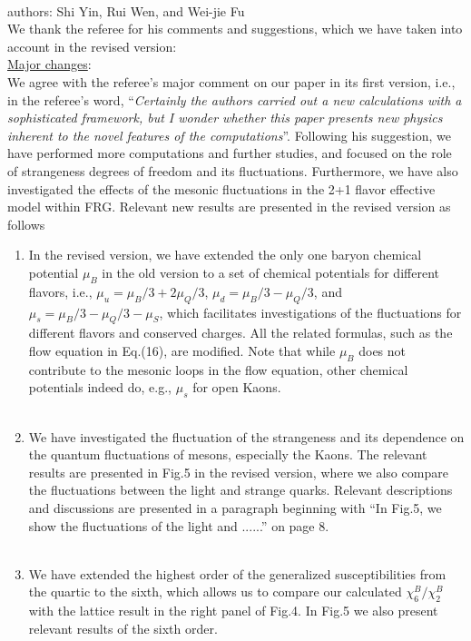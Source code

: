 \documentclass[aps,article,author-year,notitlepage,showpacs]{revtex4-1}
\begin{document}
 

\large

\\

\noindent authors: Shi Yin, Rui Wen, and Wei-jie Fu\\

\noindent We thank the referee for his comments and suggestions, which we have taken into account in the revised version:\\

\noindent \underline{Major changes}:\\

We agree with the referee's major comment on our paper in its first version, i.e., in the referee's word, ``{\it Certainly the authors carried out a new calculations with a sophisticated framework, but I wonder whether this paper presents new physics inherent to the novel features of the computations}''. Following his suggestion, we have performed more computations and further studies, and focused on the role of strangeness degrees of freedom and its fluctuations. Furthermore, we have also investigated the effects of the mesonic fluctuations in the 2+1 flavor effective model within FRG. Relevant new results are presented in the revised version as follows

\begin{enumerate}[1.]

\item In the revised version, we have extended the only one baryon chemical potential $\mu_B$ in the old version to a set of chemical potentials for different flavors, i.e., $\mu_u=\mu_B/3+2\mu_Q/3$, $\mu_d=\mu_B/3-\mu_Q/3$, and $\mu_s=\mu_B/3-\mu_Q/3-\mu_S$, which facilitates investigations of the fluctuations for different flavors and conserved charges. All the related formulas, such as the flow equation in Eq.(16), are modified. Note that while $\mu_B$ does not contribute to the mesonic loops in the flow equation, other chemical potentials indeed do, e.g., $\mu_s$ for open Kaons.\\[-3ex] 

\item We have investigated the fluctuation of the strangeness and its dependence on the quantum fluctuations of mesons, especially the Kaons. The relevant results are presented in Fig.5 in the revised version, where we also compare the fluctuations between the light and strange quarks. Relevant descriptions and discussions are presented in a paragraph beginning with ``In Fig.5, we show the fluctuations of the light and ......'' on page 8.\\[-3ex] 

\item We have extended the highest order of the generalized susceptibilities from the quartic to the sixth, which allows us to compare our calculated $\chi^{B}_6/\chi^{B}_2$ with the lattice result in the right panel of Fig.4. In Fig.5 we also present relevant results of the sixth order.\\[1ex]

\end{enumerate}
\end{document}
